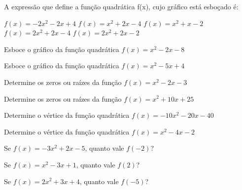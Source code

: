 \documentclass[a4paper,11pt,addpoints]{exam}
\begin{document}
\begin{questions}

	\question[1]

	A expressão que define a função quadrática f(x), cujo gráfico está esboçado
	é:

	\begin{multicols}{2}
		\begin{tasks}
			\task $f(x) = -2x^2 -2x + 4$
			\task $f(x) = x^2 + 2x - 4$
			\task $f(x) = x^2 + x - 2$
			\task $f(x) = 2x^2 + 2x - 4$
			\task $f(x) = 2x^2 + 2x - 2$
		\end{tasks}

		\begin{center}
		\end{center}
	\end{multicols}

	\question[1]

	Esboce o gráfico da função quadrática $f(x) = x^2 - 2x - 8$

	\question[1]

	Esboce o gráfico da função quadrática $f(x) = x^2 - 5x + 4$

	\question[1]

	Determine os zeros ou raízes da função $f(x) = x^2 - 2x - 3$

	\question[1]

	Determine os zeros ou raízes da função $f(x) = x^2 + 10x + 25$

	\question[1]

	Determine o vértice da função quadrática $f(x) = -10x^2 - 20x - 40$

	\question[1]

	Determine o vértice da função quadrática $f(x) = x^2 - 4x - 2$

	\question[1]

	Se $f(x) = -3x^2 + 2x - 5$, quanto vale $f(-2)$?

	\question[1]

	Se $f(x) = x^2 - 3x + 1$, quanto vale $f(2)$?

	\question[1]

	Se $f(x) = 2x^2 + 3x + 4$, quanto vale $f(-5)$?

\end{questions}
\end{document}
